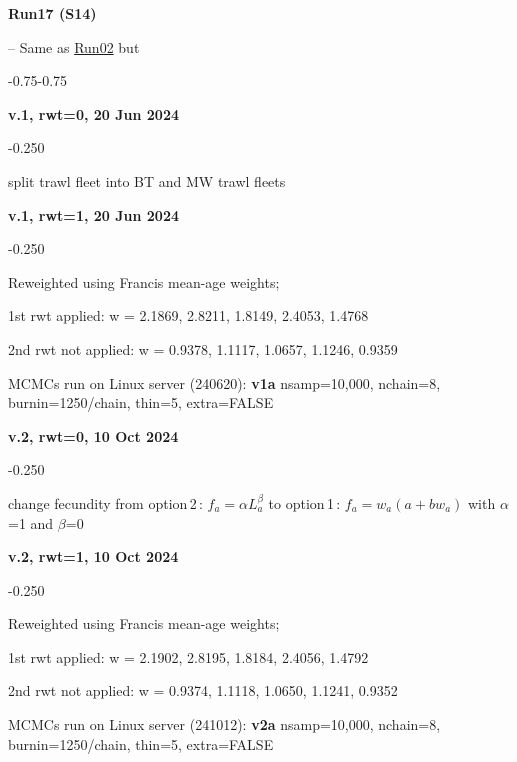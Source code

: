 \hypertarget{R17}{\textbf{Run17 (S14)}} -- Same as \hyperlink{R02}{Run02} but
\begin{itemize_csas}{-0.75}{-0.75}
	\item \textbf{v.1, rwt=0, 20 Jun 2024}
	\begin{itemize_csas}{-0.25}{0}
		\item split trawl fleet into BT and MW trawl fleets
	\end{itemize_csas}
	\item \textbf{v.1, rwt=1, 20 Jun 2024}
	\begin{itemize_csas}{-0.25}{0}
		\item Reweighted using Francis mean-age weights;
		\item 1st rwt applied: w = 2.1869, 2.8211, 1.8149, 2.4053, 1.4768
		\item 2nd rwt not applied: w = 0.9378, 1.1117, 1.0657, 1.1246, 0.9359
		\item MCMCs run on Linux server (240620): \textbf{v1a} nsamp=10,000, nchain=8, burnin=1250/chain, thin=5, extra=FALSE
	\end{itemize_csas}
	\item \textbf{v.2, rwt=0, 10 Oct 2024}
	\begin{itemize_csas}{-0.25}{0}
		\item change fecundity from option\,2\,: $f_a = \alpha L_a^{\beta}$ to option\,1\,:  $f_a = w_a (a + b w_a)$ with $\alpha$=1 and $\beta$=0
	\end{itemize_csas}
	\item \textbf{v.2, rwt=1, 10 Oct 2024}
	\begin{itemize_csas}{-0.25}{0}
		\item Reweighted using Francis mean-age weights;
		\item 1st rwt applied: w = 2.1902, 2.8195, 1.8184, 2.4056, 1.4792
		\item 2nd rwt not applied: w = 0.9374, 1.1118, 1.0650, 1.1241, 0.9352
		\item MCMCs run on Linux server (241012): \textbf{v2a} nsamp=10,000, nchain=8, burnin=1250/chain, thin=5, extra=FALSE
	\end{itemize_csas}
\end{itemize_csas}

